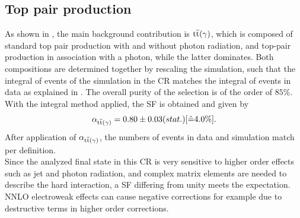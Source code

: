 \subsection{Top pair production}\label{sec:ttbar}
As shown in , the main background contribution is ${\mathrm{t}\overline{\mathrm{t}}}(\gamma)$, which is composed of standard top pair production with and without photon radiation, and top-pair production in association with a photon, while the latter dominates. Both compositions are determined together by rescaling the simulation, such that the integral of events of the simulation in the CR matches the integral of events in data as explained in . The overall purity of the selection is of the order of $85\%$.
%
With the integral method applied, the SF is obtained and given by
\begin{equation}\label{eq:AlphaTT}
 \alpha_{{\mathrm{t}\overline{\mathrm{t}}}(\gamma)}=0.80 \pm 0.03 (stat.) [\hat{=}4.0\%].
\end{equation}
After application of $\alpha_{{\mathrm{t}\overline{\mathrm{t}}}(\gamma)}$, the numbers of events in data and simulation match per definition.\\
Since the analyzed final state in this CR is very sensitive to higher order effects such as jet and photon radiation, and complex matrix elements are needed to describe the hard interaction, a SF differing from unity meets the expectation. NNLO electroweak effects can cause negative corrections for example due to destructive terms in higher order corrections.
